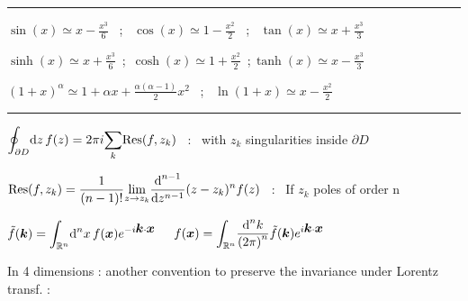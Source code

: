 \vspace{-0.1cm}\rule{\columnwidth}{0.5pt}\vspace{-0.1cm}
\item $\sin(x) \simeq x - \frac{x^{3}}{6}$ \, ; \, $\cos(x) \simeq 1 - \frac{x^{2}}{2}$ \, ; \, $\tan(x) \simeq x + \frac{x^{3}}{3}$
\item $\sinh(x) \simeq x + \frac{x^{3}}{6}$  \,;\, $\cosh(x) \simeq 1 + \frac{x^{2}}{2}$   \,;\,$\tanh(x) \simeq x - \frac{x^{3}}{3}$
\item $\left(1+x \right)^{\alpha} \simeq 1 + \alpha x + \frac{\alpha(\alpha -1)}{2}x^2$ \, ; \, $\ln(1+x) \simeq x - \frac{x^2}{2} $ 
\vspace{-0.1cm}\rule{\columnwidth}{0.5pt}\vspace{-0.1cm}
\item $\displaystyle{\oint_{\partial D}} \textrm{d} z \, f(z) = 2\pi i \displaystyle{\sum_{k}} \text{Res}(f,z_k)$ \, : \, with $z_k$ singularities inside $\partial D$  %

\item $\text{Res}(f,z_k) = \dfrac{1}{(n-1)!} \displaystyle{\lim_{z \rightarrow z_k}} \dfrac{\textrm{d} ^{n-1}}{\textrm{d} z^{n-1}} (z-z_k)^{n} f(z)$ \, : \, If $z_k$ poles of order n  
\squishend
{}

$\tilde{f}(\mbox{\boldmath$k$}) = \displaystyle{\int_{\mathbb{R}^n}} \textrm{d} ^n x \, f(\mbox{\boldmath$x$}) e^{-i\mbox{\boldmath$k$}\cdot\mbox{\boldmath$x$}}$ $ \quad f(\mbox{\boldmath$x$}) = \displaystyle{\int_{\mathbb{R}^n}} \dfrac{\textrm{d} ^n k}{\left(2\pi\right)^n} \tilde{f}(\mbox{\boldmath$k$})e^{i \mbox{\boldmath$k$}\cdot\mbox{\boldmath$x$}}$  

In 4 dimensions : another convention to preserve the invariance under Lorentz transf. : 

